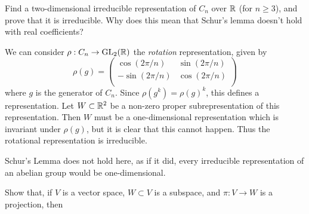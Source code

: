 \question Find a two-dimensional irreducible representation of $C_n$ over $\mathbb R$ (for $n \geq 3$), and prove that it is irreducible. Why does this mean that Schur's lemma doesn't hold with real coefficients?
\begin{solution}
    We can consider $\rho: C_n \to \operatorname{GL}_2(\mathbb R)$ the \emph{rotation} representation, given by
    \[
        \rho(g) =
        \begin{pmatrix}
            \cos(2\pi/n)  & \sin(2\pi/n) \\
            -\sin(2\pi/n) & \cos(2\pi/n) \\
        \end{pmatrix}
    \]
    where $g$ is the generator of $C_n$. Since $\rho(g^k) = \rho(g)^k$, this defines a representation. Let $W \subset \mathbb R^2$ be a non-zero proper subrepresentation of this representation. Then $W$ must be a one-dimensional representation which is invariant under $\rho(g)$, but it is clear that this cannot happen. Thus the rotational representation is irreducible.

    Schur's Lemma does not hold here, as if it did, every irreducible representation of an abelian group would be one-dimensional.
\end{solution}

\question Show that, if $V$ is a vector space, $W \subset V$ is a subspace, and $\pi: V \to W$ is a projection, then

